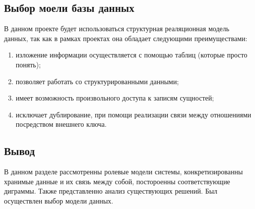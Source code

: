 \subsection{Выбор моели базы данных}

В данном проекте будет использоваться структурная реаляционная модель данных, так как в рамках проектах
она обладает следующими преимуществами:


\begin{enumerate}[label=\arabic*.]
	\item изложение информации осуществляется с помощью таблиц (которые просто понять);
	\item позволяет работать со структурированными данными;
	\item имеет возможность произвольного доступа к записям сущностей;
	\item исключает дублирование, при помощи реализации связи между отношениями посредством внешнего ключа.
\end{enumerate}

\subsection*{Вывод}

В данном разделе рассмотренны ролевые модели системы, конкретизированны хранимые данные и их
связь между собой, постороенны соответствующие диграммы. Также представленно анализ существующих решений.
Был осуществлен выбор модели данных.